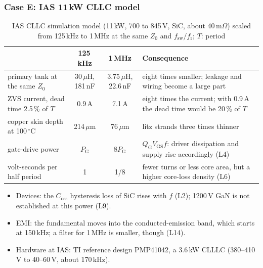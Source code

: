 \begin{frame}
	\frametitle{Case E: IAS 11\,kW CLLC model}
	\begin{table}
		\centering
		\scriptsize
		\begin{tabular}{|l|c|c|>{\raggedright\arraybackslash}p{5.3cm}|}
			\hline
			                                  & \textbf{125\,kHz}   & \textbf{1\,MHz}        & \textbf{Consequence}                                              \\
			\hline
			primary tank at the same $Z_0$    & 30\,$\mu$H, 181\,nF & 3.75\,$\mu$H, 22.6\,nF & eight times smaller; leakage and wiring become a large part        \\
			ZVS current, dead time 2.5\,\% of $T$ & 0.9\,A           & 7.1\,A                 & eight times the current; with 0.9\,A the dead time would be 20\,\% of $T$ \\
			copper skin depth at 100\,$^\circ$C & 214\,$\mu$m       & 76\,$\mu$m             & litz strands three times thinner                                   \\
			gate-drive power                  & $P_\mathrm{G}$      & $8P_\mathrm{G}$        & $Q_\mathrm{G}V_\mathrm{GS}f$: driver dissipation and supply rise accordingly (L4) \\
			volt-seconds per half period      & 1                   & 1/8                    & fewer turns or less core area, but a higher core-loss density (L6) \\
			\hline
		\end{tabular}
		\caption{IAS CLLC simulation model (11\,kW, 700 to 845\,V, SiC, about 40\,m$\Omega$) scaled from 125\,kHz to 1\,MHz at the same $Z_0$ and $f_\mathrm{sw}/f_\mathrm{r}$; $T$: period}
	\end{table}
	\vspace{-0.4cm}
	\footnotesize
	\begin{itemize}
		\item Devices: the $C_\mathrm{oss}$ hysteresis loss of SiC rises with $f$ (L2); 1200\,V GaN is not established at this power (L9).
		\item EMI: the fundamental moves into the conducted-emission band, which starts at 150\,kHz; a filter for 1\,MHz is smaller, though (L14).
		\item Hardware at IAS: TI reference design PMP41042, a 3.6\,kW CLLLC (380--410\,V to 40--60\,V, about 170\,kHz).
	\end{itemize}
\end{frame}

